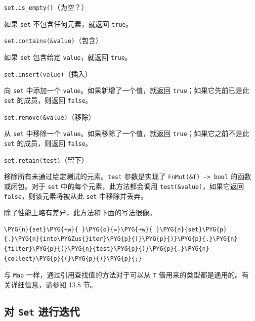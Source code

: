 \begin{mySidenote}
\texttt{set.is\_empty()}（为空？）
\end{mySidenote}

如果 \texttt{set} 不包含任何元素，就返回 \texttt{true}。

\begin{mySidenote}
\texttt{set.contains(\&value)}（包含）
\end{mySidenote}

如果 \texttt{set} 包含给定 \texttt{value}，就返回 \texttt{true}。

\begin{mySidenote}
\texttt{set.insert(value)}（插入）
\end{mySidenote}

向 \texttt{set} 中添加一个 \texttt{value}。如果新增了一个值，就返回 \texttt{true}；如果它先前已是此 \texttt{set} 的成员，则返回 \texttt{false}。

\begin{mySidenote}
\texttt{set.remove(\&value)}（移除）
\end{mySidenote}

从 \texttt{set} 中移除一个 \texttt{value}。如果移除了一个值，就返回 \texttt{true}；如果它之前不是此 \texttt{set} 的成员，则返回 \texttt{false}。

\begin{mySidenote}
\texttt{set.retain(test)}（留下）
\end{mySidenote}

移除所有未通过给定测试的元素。\texttt{test} 参数是实现了 \texttt{FnMut(\&T) -> bool} 的函数或闭包。对于 \texttt{set} 中的每个元素，此方法都会调用 \texttt{test(\&value)}，如果它返回 \texttt{false}，则该元素将被从此 \texttt{set} 中移除并丢弃。

除了性能上略有差异，此方法和下面的写法很像。

\begin{Verbatim}[commandchars=\\\{\},breaklines=true,breakanywhere=true,fontsize=\codefont,xleftmargin=17bp]
\PYG{n}{set}\PYG{+w}{ }\PYG{o}{=}\PYG{+w}{ }\PYG{n}{set}\PYG{p}{.}\PYG{n}{into\PYGZus{}iter}\PYG{p}{(}\PYG{p}{)}\PYG{p}{.}\PYG{n}{filter}\PYG{p}{(}\PYG{n}{test}\PYG{p}{)}\PYG{p}{.}\PYG{n}{collect}\PYG{p}{(}\PYG{p}{)}\PYG{p}{;}
\end{Verbatim}

与 \texttt{Map} 一样，通过引用查找值的方法对于可以从 \texttt{T} 借用来的类型都是通用的。有关详细信息，请参阅 13.8 节。

\subsection{对 \texttt{Set} 进行迭代}

